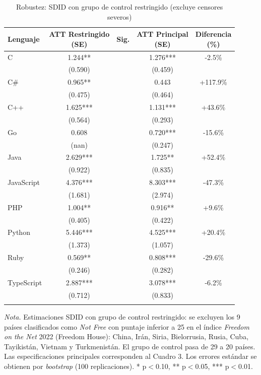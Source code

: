 \begin{table}[H]\centering
\caption{Robustez: SDID con grupo de control restringido (excluye censores severos)}
\label{tab:tabla6}
\begin{threeparttable}
{\def\sym#1{\ifmmode^{#1}\else\(^{#1}\)\fi}
\begin{tabular}{lcccc}
\toprule
Lenguaje & \shortstack{ATT Restringido \\ (SE)} & Sig. & \shortstack{ATT Principal \\ (SE)} & \shortstack{Diferencia \\ (\%)} \\
\midrule
C & 1.244** & & 1.276*** & -2.5\% \\
         & (0.590) & & (0.459) & \\
\addlinespace
C\# & 0.965** & & 0.443 & +117.9\% \\
         & (0.475) & & (0.464) & \\
\addlinespace
C++ & 1.625*** & & 1.131*** & +43.6\% \\
         & (0.564) & & (0.293) & \\
\addlinespace
Go & 0.608 & & 0.720*** & -15.6\% \\
         & (nan) & & (0.247) & \\
\addlinespace
Java & 2.629*** & & 1.725** & +52.4\% \\
         & (0.922) & & (0.835) & \\
\addlinespace
JavaScript & 4.376*** & & 8.303*** & -47.3\% \\
         & (1.681) & & (2.974) & \\
\addlinespace
PHP & 1.004** & & 0.916** & +9.6\% \\
         & (0.405) & & (0.422) & \\
\addlinespace
Python & 5.446*** & & 4.525*** & +20.4\% \\
         & (1.373) & & (1.057) & \\
\addlinespace
Ruby & 0.569** & & 0.808*** & -29.6\% \\
         & (0.246) & & (0.282) & \\
\addlinespace
TypeScript & 2.887*** & & 3.078*** & -6.2\% \\
         & (0.712) & & (0.833) & \\
\addlinespace
\bottomrule
\end{tabular}}
\begin{tablenotes}
\footnotesize
\item \textit{Nota.} Estimaciones SDID con grupo de control restringido: se excluyen los 9 países clasificados como \textit{Not Free} con puntaje inferior a 25 en el índice \textit{Freedom on the Net} 2022 (Freedom House): China, Irán, Siria, Bielorrusia, Rusia, Cuba, Tayikistán, Vietnam y Turkmenistán. El grupo de control pasa de 29 a 20 países. Las especificaciones principales corresponden al Cuadro 3. Los errores est\'{a}ndar se obtienen por \textit{bootstrap} (100 replicaciones). * p$<$0.10, ** p$<$0.05, *** p$<$0.01.
\end{tablenotes}
\end{threeparttable}
\end{table}
